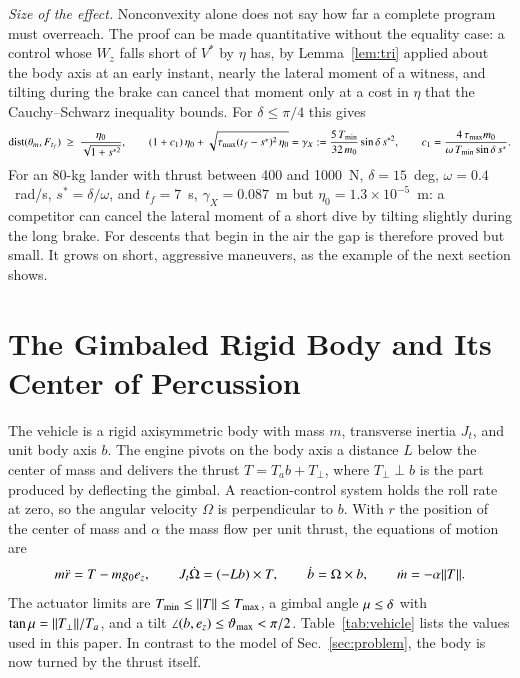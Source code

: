 \emph{Size of the effect.} Nonconvexity alone does not say how far a complete program must overreach. The proof can be made
quantitative without the equality case: a control whose $W_z$ falls short of $V^*$ by $\eta$ has, by Lemma~\ref{lem:tri}
applied about the body axis at an early instant, nearly the lateral moment of a witness, and tilting during the brake can
cancel that moment only at a cost in $\eta$ that the Cauchy--Schwarz inequality bounds. For $\delta\le\pi/4$ this gives
\begin{equation}\label{eq:eta}
\operatorname{dist}(\theta_m,\F)\ \ge\ \frac{\eta_0}{\sqrt{1+s^{*2}}},\qquad
(1+c_1)\,\eta_0+\sqrt{\tau_{\max}(t_f-s^*)^2\,\eta_0}=\gamma_X:=\frac{5\,\Tmin}{32\,m_0}\sin\delta\,s^{*2},\qquad
c_1=\frac{4\,\tau_{\max}m_0}{\omega\,\Tmin\sin\delta\,s^*} .
\end{equation}
For an 80-kg lander with
thrust between 400 and 1000~N, $\delta=15$~deg, $\omega=0.4$~rad/s, $s^*=\delta/\omega$, and $t_f=7$~s, $\gamma_X=0.087$~m but
$\eta_0=1.3\times10^{-5}$~m: a competitor can cancel the lateral moment of a short dive by tilting slightly during the long
brake. For descents that begin
in the air the gap is therefore proved but small. It grows on short, aggressive maneuvers, as the example of the next
section shows.

\section{The Gimbaled Rigid Body and Its Center of Percussion}\label{sec:model}
The vehicle is a rigid axisymmetric body with mass $m$, transverse inertia $J_t$, and unit body axis $b$.
The engine pivots on the body axis a distance $L$ below the center of mass and delivers the thrust $T=T_ab+T_\perp$, where
$T_\perp\perp b$ is the part produced by deflecting the gimbal. A reaction-control system holds the roll rate at zero, so the
angular velocity $\Omega$ is perpendicular to $b$. With $r$ the position of the center of mass and $\alpha$ the mass flow per
unit thrust, the equations of motion are
\begin{equation}\label{eq:eom}
m\ddot r=T-mg_0e_z,\qquad J_t\dot\Omega=(-Lb)\times T,\qquad \dot b=\Omega\times b,\qquad \dot m=-\alpha\lVert T\rVert .
\end{equation}
The actuator limits are $T_{\min}\le\lVert T\rVert\le T_{\max}$, a gimbal angle $\mu\le\delta$ with $\tan\mu=\lVert T_\perp\rVert/T_a$, and a tilt
$\angle(b,e_z)\le\vartheta_{\max}<\pi/2$. Table~\ref{tab:vehicle} lists the values used in this paper. In contrast to the model of Sec.~\ref{sec:problem}, the body is now turned by the thrust itself.

